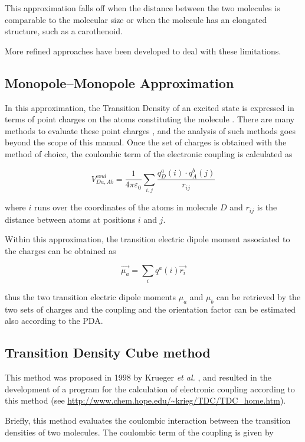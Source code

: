 \documentclass[a4paper]{article}
\begin{document}
This approximation falls off when the distance between the two molecules is comparable to the molecular size or when the molecule has an elongated structure, such as a carothenoid.

More refined approaches have been developed to deal with these limitations.

\subsection*{Monopole--Monopole Approximation}
In this approximation, the Transition Density of an excited state is expressed in terms of point charges on the atoms constituting the molecule \cite{Woody1968}. There are many methods to evaluate these point charges \cite{Madjet2006}, and the analysis of such methods goes beyond the scope of this manual. Once the set of charges is obtained with the method of choice, the coulombic term of the electronic coupling is calculated as

\begin{equation}
 V^{coul}_{Da,Ab} = \frac{1}{4\pi\varepsilon_0} \sum_{i,j} \frac{q_D^a(i)\cdot q_A^b(j)}{r_{ij}}
 \label{eq:MMA}
\end{equation}

where $i$ runs over the coordinates of the atoms in molecule $D$ and $r_{ij}$ is the distance between atoms at positions $i$ and $j$.

Within this approximation, the transition electric dipole moment associated to the charges can be obtained as

\begin{equation}
 \vec{\mu_a} = \sum_i q^a(i) \vec{r_i}
 \label{eq:mu_MMA}
\end{equation}

thus the two transition electric dipole moments $\mu_a$ and $\mu_b$ can be retrieved by the two sets of charges and the coupling and the orientation factor can be estimated also according to the PDA.

\subsection*{Transition Density Cube method}
This method was proposed in 1998 by Krueger \textit{et al.} \cite{Krueger1998}, and resulted in the development of a program for the calculation of electronic coupling according to this method (see \url{http://www.chem.hope.edu/~krieg/TDC/TDC_home.htm}).

Briefly, this method evaluates the coulombic interaction between the transition densities of two molecules. The coulombic term of the coupling is given by
\end{document}
